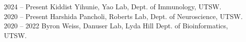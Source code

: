 2024 -- Present \hspace{14pt} Kiddist Yihunie, Yao Lab, Dept. of Immunology, UTSW. \\
2020 -- Present \hspace{14pt} Harshida Pancholi, Roberts Lab, Dept. of Neuroscience, UTSW. \\
2020 -- 2022 \hspace{28pt} Byron Weiss, Danuser Lab, Lyda Hill Dept. of Bioinformatics, UTSW. \\

